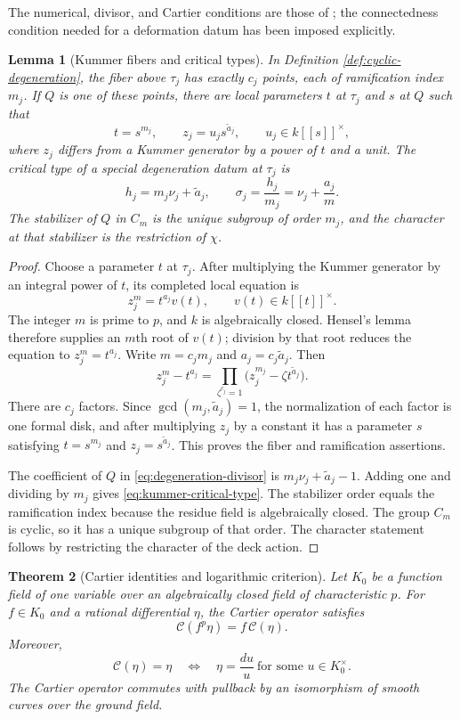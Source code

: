 \documentclass[11pt]{amsart}
\theoremstyle{plain}
\newtheorem{theorem}{Theorem}[section]
\newtheorem{lemma}[theorem]{Lemma}
\theoremstyle{definition}
\numberwithin{equation}{section}
\begin{document}
The numerical, divisor, and Cartier conditions are those of
\cite[Definition~3.1 and equations~(29)--(30)]{WewersMeta}; the connectedness
condition needed for a deformation datum has been imposed explicitly.

\begin{lemma}[Kummer fibers and critical types]
\label{lem:kummer-critical-type}
In Definition \ref{def:cyclic-degeneration}, the fiber above $\tau_j$ has
exactly $c_j$ points, each of ramification index $m_j$.  If $Q$ is one of
these points, there are local parameters $t$ at $\tau_j$ and $s$ at $Q$
such that
\[
 t=s^{m_j},\qquad z_j=u_js^{\widetilde a_j},\qquad
 u_j\in k[[s]]^\times,
\]
where $z_j$ differs from a Kummer generator by a power of $t$ and a unit.
The critical type of a special degeneration datum at $\tau_j$ is
\[
 h_j=m_j\nu_j+\widetilde a_j,
 \qquad
 \sigma_j=\frac{h_j}{m_j}=\nu_j+\frac{a_j}{m}.
 \label{eq:kummer-critical-type}
\]
The stabilizer of $Q$ in $C_m$ is the unique subgroup of order $m_j$, and
the character at that stabilizer is the restriction of $\chi$.
\end{lemma}

\begin{proof}
Choose a parameter $t$ at $\tau_j$.  After multiplying the Kummer generator
by an integral power of $t$, its completed local equation is
\[
 z_j^m=t^{a_j}v(t),\qquad v(t)\in k[[t]]^\times.
\]
The integer $m$ is prime to $p$, and $k$ is algebraically closed.  Hensel's
lemma therefore supplies an $m$th root of $v(t)$; division by that root
reduces the equation to $z_j^m=t^{a_j}$.  Write
$m=c_jm_j$ and $a_j=c_j\widetilde a_j$.  Then
\[
 z_j^m-t^{a_j}
 =\prod_{\zeta^{c_j}=1}
   \bigl(z_j^{m_j}-\zeta t^{\widetilde a_j}\bigr).
\]
There are $c_j$ factors.  Since
$\gcd(m_j,\widetilde a_j)=1$, the normalization of each factor is one
formal disk, and after multiplying $z_j$ by a constant it has a parameter
$s$ satisfying $t=s^{m_j}$ and $z_j=s^{\widetilde a_j}$.  This proves the
fiber and ramification assertions.

The coefficient of $Q$ in \eqref{eq:degeneration-divisor} is
$m_j\nu_j+\widetilde a_j-1$.  Adding one and dividing by $m_j$ gives
\eqref{eq:kummer-critical-type}.  The stabilizer order equals the
ramification index because the residue field is algebraically closed.
The group $C_m$ is cyclic, so it has a unique subgroup of that order.  The
character statement follows by restricting the character of the deck
action.
\end{proof}

\begin{theorem}[Cartier identities and logarithmic criterion]
\label{thm:cartier-criterion}
Let $K_0$ be a function field of one variable over an algebraically closed
field of characteristic $p$.  For $f\in K_0$ and a rational differential $\eta$,
the Cartier operator satisfies
\[
 \mathcal C(f^p\eta)=f\,\mathcal C(\eta).
\]
Moreover,
\[
 \mathcal C(\eta)=\eta
 \quad\Longleftrightarrow\quad
 \eta=\frac{du}{u}\ \text{for some }u\in K_0^\times.
\]
The Cartier operator commutes with pullback by an isomorphism of smooth
curves over the ground field.
\end{theorem}
\end{document}
